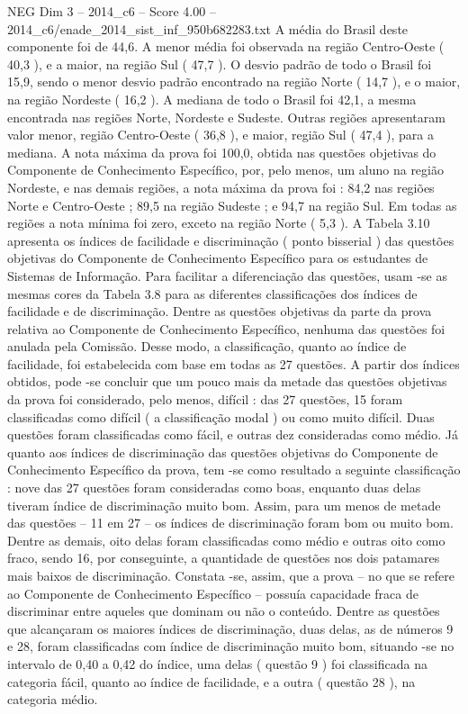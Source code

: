 \begin{textsample}{NEG Dim 3 – 2014\_c6 – Score 4.00 – 2014\_c6/enade\_2014\_sist\_inf\_950b682283.txt}
A média do Brasil deste componente foi de 44,6.
A menor média foi observada na região Centro-Oeste ( 40,3 ), e a maior, na região Sul ( 47,7 ).
O desvio padrão de todo o Brasil foi 15,9, sendo o menor desvio padrão encontrado na região Norte ( 14,7 ), e o maior, na região Nordeste ( 16,2 ).
A mediana de todo o Brasil foi 42,1, a mesma encontrada nas regiões Norte, Nordeste e Sudeste.
Outras regiões apresentaram valor menor, região Centro-Oeste ( 36,8 ), e maior, região Sul ( 47,4 ), para a mediana.
A nota máxima da prova foi 100,0, obtida nas questões objetivas do Componente de Conhecimento Específico, por, pelo menos, um aluno na região Nordeste, e nas demais regiões, a nota máxima da prova foi : 84,2 nas regiões Norte e Centro-Oeste ; 89,5 na região Sudeste ; e 94,7 na região Sul.
Em todas as regiões a nota mínima foi zero, exceto na região Norte ( 5,3 ).
A Tabela 3.10 apresenta os índices de facilidade e discriminação ( ponto bisserial ) das questões objetivas do Componente de Conhecimento Específico para os estudantes de Sistemas de Informação.
Para facilitar a diferenciação das questões, usam -se as mesmas cores da Tabela 3.8 para as diferentes classificações dos índices de facilidade e de discriminação.
Dentre as questões objetivas da parte da prova relativa ao Componente de Conhecimento Específico, nenhuma das questões foi anulada pela Comissão.
Desse modo, a classificação, quanto ao índice de facilidade, foi estabelecida com base em todas as 27 questões.
A partir dos índices obtidos, pode -se concluir que um pouco mais da metade das questões objetivas da prova foi considerado, pelo menos, difícil : das 27 questões, 15 foram classificadas como difícil ( a classificação modal ) ou como muito difícil.
Duas questões foram classificadas como fácil, e outras dez consideradas como médio.
Já quanto aos índices de discriminação das questões objetivas do Componente de Conhecimento Específico da prova, tem -se como resultado a seguinte classificação : nove das 27 questões foram consideradas como boas, enquanto duas delas tiveram índice de discriminação muito bom.
Assim, para um menos de metade das questões – 11 em 27 – os índices de discriminação foram bom ou muito bom.
Dentre as demais, oito delas foram classificadas como médio e outras oito como fraco, sendo 16, por conseguinte, a quantidade de questões nos dois patamares mais baixos de discriminação.
Constata -se, assim, que a prova – no que se refere ao Componente de Conhecimento Específico – possuía capacidade fraca de discriminar entre aqueles que dominam ou não o conteúdo.
Dentre as questões que alcançaram os maiores índices de discriminação, duas delas, as de números 9 e 28, foram classificadas com índice de discriminação muito bom, situando -se no intervalo de 0,40 a 0,42 do índice, uma delas ( questão 9 ) foi classificada na categoria fácil, quanto ao índice de facilidade, e a outra ( questão 28 ), na categoria médio.

\end{textsample}
